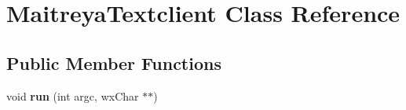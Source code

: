 \hypertarget{classMaitreyaTextclient}{\section{Maitreya\-Textclient Class Reference}
\label{classMaitreyaTextclient}
}
\subsection*{Public Member Functions}
\begin{DoxyCompactItemize}
\item 
\hypertarget{classMaitreyaTextclient_a7eb75b7d52b0bb1261c9e74cc0495b9b}{void {\bfseries run} (int argc, wx\-Char $\ast$$\ast$)}\label{classMaitreyaTextclient_a7eb75b7d52b0bb1261c9e74cc0495b9b}

\end{DoxyCompactItemize}
